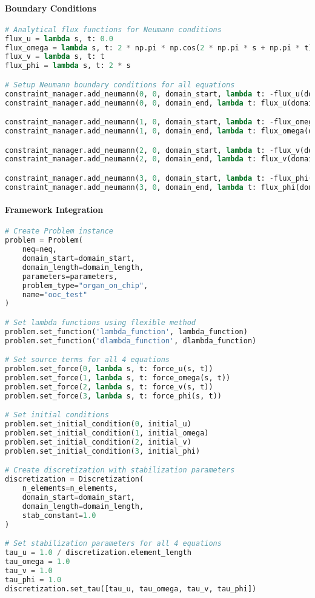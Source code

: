 \paragraph{Boundary Conditions}
\begin{lstlisting}[language=Python, caption=Python Boundary Conditions]
# Analytical flux functions for Neumann conditions
flux_u = lambda s, t: 0.0
flux_omega = lambda s, t: 2 * np.pi * np.cos(2 * np.pi * s + np.pi * t) 
flux_v = lambda s, t: t
flux_phi = lambda s, t: 2 * s

# Setup Neumann boundary conditions for all equations
constraint_manager.add_neumann(0, 0, domain_start, lambda t: -flux_u(domain_start, t))
constraint_manager.add_neumann(0, 0, domain_end, lambda t: flux_u(domain_end, t))

constraint_manager.add_neumann(1, 0, domain_start, lambda t: -flux_omega(domain_start, t))
constraint_manager.add_neumann(1, 0, domain_end, lambda t: flux_omega(domain_end, t))

constraint_manager.add_neumann(2, 0, domain_start, lambda t: -flux_v(domain_start, t))
constraint_manager.add_neumann(2, 0, domain_end, lambda t: flux_v(domain_end, t))

constraint_manager.add_neumann(3, 0, domain_start, lambda t: -flux_phi(domain_start, t))
constraint_manager.add_neumann(3, 0, domain_end, lambda t: flux_phi(domain_end, t))
\end{lstlisting}

\paragraph{Framework Integration}
\begin{lstlisting}[language=Python, caption=BioNetFlux Framework Integration]
# Create Problem instance
problem = Problem(
    neq=neq,
    domain_start=domain_start,
    domain_length=domain_length,
    parameters=parameters,
    problem_type="organ_on_chip",
    name="ooc_test"
)

# Set lambda functions using flexible method
problem.set_function('lambda_function', lambda_function)  
problem.set_function('dlambda_function', dlambda_function)

# Set source terms for all 4 equations
problem.set_force(0, lambda s, t: force_u(s, t))
problem.set_force(1, lambda s, t: force_omega(s, t))
problem.set_force(2, lambda s, t: force_v(s, t))
problem.set_force(3, lambda s, t: force_phi(s, t))

# Set initial conditions
problem.set_initial_condition(0, initial_u)
problem.set_initial_condition(1, initial_omega)
problem.set_initial_condition(2, initial_v) 
problem.set_initial_condition(3, initial_phi)

# Create discretization with stabilization parameters
discretization = Discretization(
    n_elements=n_elements,
    domain_start=domain_start,
    domain_length=domain_length,
    stab_constant=1.0
)

# Set stabilization parameters for all 4 equations
tau_u = 1.0 / discretization.element_length
tau_omega = 1.0
tau_v = 1.0  
tau_phi = 1.0
discretization.set_tau([tau_u, tau_omega, tau_v, tau_phi])
\end{lstlisting}

